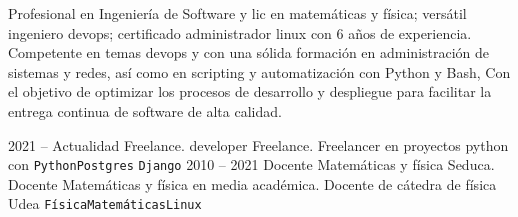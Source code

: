 \documentclass[9pt]{developercv} %
\begin{document}
\vspace{0.5cm}



\begin{minipage}[t]{0.4\textwidth} %
	\vspace{-\baselineskip} %
Profesional en Ingeniería de Software y lic en matemáticas y física; versátil ingeniero devops; certificado administrador linux con  6 años de  experiencia. Competente en temas devops y con una sólida formación en administración de sistemas y redes, así como en scripting y automatización con Python y Bash, Con el objetivo de optimizar los procesos de desarrollo y despliegue para facilitar la entrega continua de software de alta calidad.
\end{minipage}
\hfill %
\begin{minipage}[t]{0.5\textwidth} %
	\vspace{-\baselineskip} %
	\begin{barchart}{5.5}
	\end{barchart}
\end{minipage}

\begin{center}
\end{center}



\begin{entrylist}
	\entry
		{2021 -- Actualidad}
		{Freelance. developer}
		{Freelance.}
		{Freelancer en proyectos python con  \texttt{Python}\slashsep\texttt{Postgres}				   \slashsep\texttt{Django}}
	\entry
		{2010 -- 2021}
		{Docente Matemáticas y física}
		{Seduca.}
		{Docente Matemáticas y física en media académica. Docente de cátedra de física Udea \texttt{Física}\slashsep\texttt{Matemáticas}\slashsep\texttt{Linux}}
	
\end{entrylist}
\end{document}
